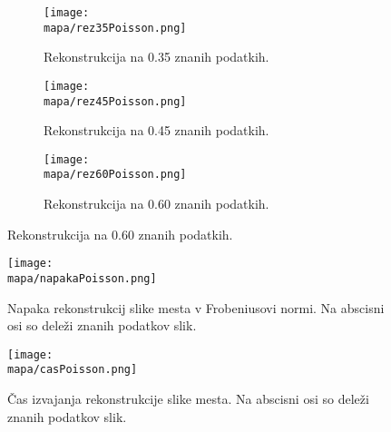 \renewcommand{\mapa}{Poglavja/Slike/kompleksnost/kompleksna grayscale 300}

\begin{figure}[H]
    \begin{subfigure}{0.32\linewidth}
        \texttt{[image: \\mapa/rez35Poisson.png]}
        \caption{Rekonstrukcija na 0.35 znanih podatkih.}
    \end{subfigure}
    \hfill
    \begin{subfigure}{0.32\linewidth}
        \texttt{[image: \\mapa/rez45Poisson.png]}
        \caption{Rekonstrukcija na 0.45 znanih podatkih.}
    \end{subfigure}
    \hfill
    \begin{subfigure}{0.32\linewidth}
        \texttt{[image: \\mapa/rez60Poisson.png]}
        \caption{Rekonstrukcija na 0.60 znanih podatkih.}
    \end{subfigure}
\end{figure}

\begin{figure}[H]
    \texttt{[image: \\mapa/napakaPoisson.png]}
    \caption{Napaka rekonstrukcij slike mesta v Frobeniusovi normi. Na abscisni osi so deleži znanih podatkov slik.}
\end{figure}

\begin{figure}[H]
    \texttt{[image: \\mapa/casPoisson.png]}
    \caption{Čas izvajanja rekonstrukcije slike mesta. Na abscisni osi so deleži znanih podatkov slik.}
\end{figure} 
